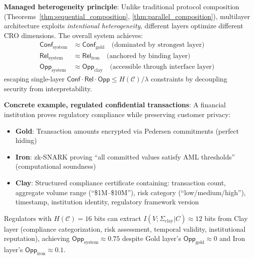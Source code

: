 \documentclass{ieeeaccess}
\begin{document}
\textbf{Managed heterogeneity principle}: Unlike traditional protocol composition (Theorems~\ref{thm:sequential_composition}, \ref{thm:parallel_composition}), multilayer architecture exploits \emph{intentional heterogeneity}, different layers optimize different CRO dimensions. The overall system achieves:
\begin{align}
\mathsf{Conf}_{\text{system}} &\approx \mathsf{Conf}_{\text{gold}} \quad \text{(dominated by strongest layer)} \\
\mathsf{Rel}_{\text{system}} &\approx \mathsf{Rel}_{\text{iron}} \quad \text{(anchored by binding layer)} \\
\mathsf{Opp}_{\text{system}} &\approx \mathsf{Opp}_{\text{clay}} \quad \text{(accessible through interface layer)}
\end{align}
escaping single-layer $\mathsf{Conf} \cdot \mathsf{Rel} \cdot \mathsf{Opp} \leq H(\mathcal{C})/\lambda$ constraints by decoupling security from interpretability.

\textbf{Concrete example, regulated confidential transactions}: A financial institution proves regulatory compliance while preserving customer privacy:
\begin{itemize}
\item \textbf{Gold}: Transaction amounts encrypted via Pedersen commitments (perfect hiding)
\item \textbf{Iron}: zk-SNARK proving ``all committed values satisfy AML thresholds'' (computational soundness)
\item \textbf{Clay}: Structured compliance certificate containing: transaction count, aggregate volume range (``\$1M--\$10M''), risk category (``low/medium/high''), timestamp, institution identity, regulatory framework version
\end{itemize}
Regulators with $H(\mathcal{C}) = 16$ bits can extract $I(V;\Sigma_{\text{clay}}|C) \approx 12$ bits from Clay layer (compliance categorization, risk assessment, temporal validity, institutional reputation), achieving $\mathsf{Opp}_{\text{system}} \approx 0.75$ despite Gold layer's $\mathsf{Opp}_{\text{gold}} \approx 0$ and Iron layer's $\mathsf{Opp}_{\text{iron}} \approx 0.1$.
\end{document}

